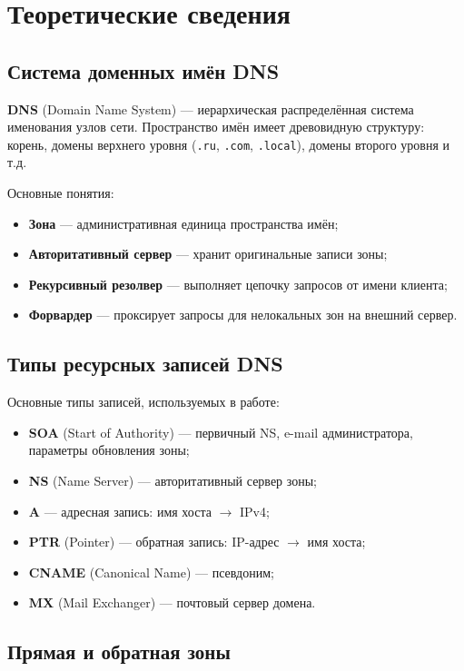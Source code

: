 \chapter{Теоретические сведения}
\label{ch:theory}

\section{Система доменных имён DNS}

\textbf{DNS} (Domain Name System) — иерархическая распределённая система именования
узлов сети. Пространство имён имеет древовидную структуру: корень, домены верхнего
уровня (\texttt{.ru}, \texttt{.com}, \texttt{.local}), домены второго уровня и т.д.

Основные понятия:
\begin{itemize}
  \item \textbf{Зона} — административная единица пространства имён;
  \item \textbf{Авторитативный сервер} — хранит оригинальные записи зоны;
  \item \textbf{Рекурсивный резолвер} — выполняет цепочку запросов от имени клиента;
  \item \textbf{Форвардер} — проксирует запросы для нелокальных зон на внешний сервер.
\end{itemize}

\section{Типы ресурсных записей DNS}

Основные типы записей, используемых в работе:
\begin{itemize}
  \item \textbf{SOA} (Start of Authority) — первичный NS, e-mail администратора,
        параметры обновления зоны;
  \item \textbf{NS} (Name Server) — авторитативный сервер зоны;
  \item \textbf{A} — адресная запись: имя хоста $\to$ IPv4;
  \item \textbf{PTR} (Pointer) — обратная запись: IP-адрес $\to$ имя хоста;
  \item \textbf{CNAME} (Canonical Name) — псевдоним;
  \item \textbf{MX} (Mail Exchanger) — почтовый сервер домена.
\end{itemize}

\section{Прямая и обратная зоны}

